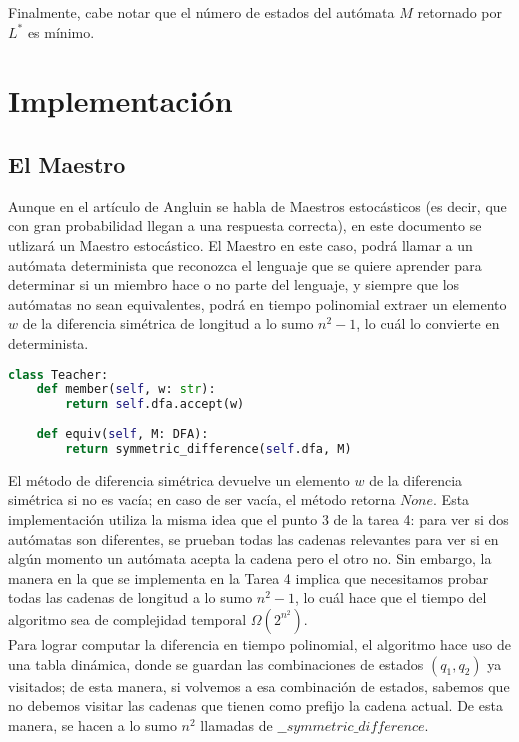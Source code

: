 \documentclass[12pt]{amsart}
\begin{document}
Finalmente, cabe notar que el número de estados del autómata $M$ retornado por $L^{*}$ es mínimo. \\

\section{Implementación}

\subsection{El Maestro}

Aunque en el artículo de  Angluin se habla de Maestros estocásticos (es decir, que con gran probabilidad llegan a una respuesta correcta), en este documento se utlizará un Maestro estocástico. El Maestro en este caso, podrá llamar a un autómata determinista que reconozca el lenguaje que se quiere aprender para determinar si un miembro hace o no parte del lenguaje, y siempre que los autómatas no sean equivalentes, podrá en tiempo polinomial extraer un elemento $w$ de la diferencia simétrica de longitud a lo sumo $n^2-1$, lo cuál lo convierte en determinista. \\

\begin{lstlisting}[language = Python]
class Teacher:
    def member(self, w: str):
        return self.dfa.accept(w)
    
    def equiv(self, M: DFA):
        return symmetric_difference(self.dfa, M)
\end{lstlisting}

El método de diferencia simétrica devuelve un elemento $w$ de la diferencia simétrica si no es vacía; en caso de ser vacía, el método retorna $None$. Esta implementación utiliza la misma idea que el punto 3 de la tarea 4: para ver si dos autómatas son diferentes, se prueban todas las cadenas relevantes para ver si en algún momento un autómata acepta la cadena pero el otro no. Sin embargo, la manera en la que se implementa en la Tarea 4 implica que necesitamos probar todas las cadenas de longitud a lo sumo $n^{2}-1$, lo cuál hace que el tiempo del algoritmo sea de complejidad temporal $\Omega(2^{n^2})$. \\

Para lograr computar la diferencia en tiempo polinomial, el algoritmo hace uso de una tabla dinámica, donde se guardan las combinaciones de estados $(q_1, q_2)$ ya visitados; de esta manera, si volvemos a esa combinación de estados, sabemos que no debemos visitar las cadenas que tienen como prefijo la cadena actual. De esta manera, se hacen a lo sumo $n^{2}$ llamadas de $\_\_symmetric\_difference$. \\
\end{document}
